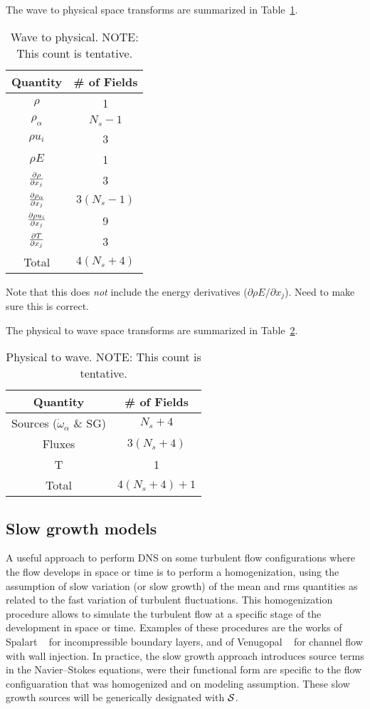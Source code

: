 The wave to physical space transforms are summarized in
Table~\ref{tbl:w2p}.
%
\begin{table}[ht]
\caption{Wave to physical.  NOTE: This count is tentative.}
\begin{tabular}{|c|c|}
\hline
Quantity & \# of Fields \\
\hline
\hline
$\rho$ & 1 \\
$\rho_{\alpha}$ & $N_s - 1$ \\
$\rho u_i$ & 3 \\
$\rho E$ & 1 \\
$\frac{\partial \rho}{\partial x_j}$ & 3 \\
$\frac{\partial \rho_{\alpha}}{\partial x_j}$ & $3 (N_s - 1)$ \\
$\frac{\partial \rho u_i}{\partial x_j}$ & 9 \\
$\frac{\partial T}{\partial x_j}$ & 3 \\
\hline
Total & $4(N_s + 4)$\\
\hline
\end{tabular}
\label{tbl:w2p}
\end{table}
% 
Note that this does \emph{not} include the energy derivatives
($\partial \rho E / \partial x_j$).  Need to make sure this is
correct.

The physical to wave space transforms are summarized in
Table~\ref{tbl:p2w}.
%
\begin{table}[ht]
\caption{Physical to wave.  NOTE: This count is tentative.}
\begin{tabular}{|c|c|}
\hline
Quantity & \# of Fields \\
\hline
\hline
Sources ($\dot{\omega}_{\alpha}$ \& SG) & $N_s + 4$ \\
Fluxes & $3 (N_s +4)$ \\
T & 1 \\
\hline
Total & $4(N_s + 4) + 1$\\
\hline
\end{tabular}
\label{tbl:p2w}
\end{table}
% 


\subsection{Slow growth models}
\label{sec:slowgrowthmodels}
A useful approach to perform DNS on some turbulent flow configurations where the
flow develops in space or time is to perform a homogenization, using the
assumption of slow variation (or slow growth) of the mean and rms quantities
as related to the fast variation of turbulent fluctuations. This
homogenization procedure allows to simulate the turbulent flow at a specific
stage of the development in space or time. Examples of these procedures are the
works of Spalart ~\citep{Spalart1988Direct} for incompressible boundary layers,
and of Venugopal ~\citep{Venugopal2003} for channel flow with wall injection.
In practice, the slow growth approach introduces source terms in the
Navier--Stokes equations, were their functional form are specific to the flow
configuaration that was homogenized and on modeling assumption. These slow
growth sources will be generically designated with $\mathcal{S}$.


